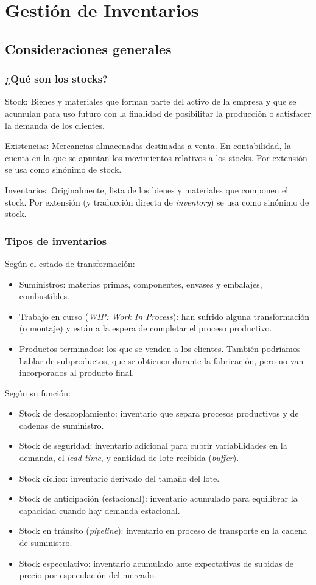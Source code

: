 \chapter{Gestión de Inventarios}
\section{Consideraciones generales}
\subsection{¿Qué son los stocks?}
Stock: Bienes y materiales que forman parte del activo de la empresa y que se acumulan para uso futuro con la finalidad de posibilitar la producción o satisfacer la demanda de los clientes.

Existencias: Mercancias almacenadas destinadas a venta. En contabilidad, la cuenta en la que se apuntan los movimientos relativos a los stocks. Por extensión se usa como sinónimo de stock.

Inventarios: Originalmente, lista de los bienes y materiales que componen el stock. Por extensión (y traducción directa de \textit{inventory}) se usa como sinónimo de stock.

\subsection{Tipos de inventarios}
Según el estado de transformación:
\begin{itemize}
    \item Suministros: materias primas, componentes, envases y embalajes, combustibles.
    \item Trabajo en curso (\textit{WIP: Work In Process}): han sufrido alguna transformación (o montaje) y están a la espera de completar el proceso productivo.
    \item Productos terminados: los que se venden a los clientes. También podríamos hablar de subproductos, que se obtienen durante la fabricación, pero no van incorporados al producto final.
\end{itemize}

Según su función:
\begin{itemize}
    \item Stock de desacoplamiento: inventario que separa procesos productivos y de cadenas de suministro.
    \item Stock de seguridad: inventario adicional para cubrir variabilidades en la demanda, el \textit{lead time}, y cantidad de lote recibida (\textit{buffer}).
    \item Stock cíclico: inventario derivado del tamaño del lote.
    \item Stock de anticipación (estacional): inventario acumulado para equilibrar la capacidad cuando hay demanda estacional.
    \item Stock en tránsito (\textit{pipeline}): inventario en proceso de transporte en la cadena de suministro.
    \item Stock especulativo: inventario acumulado ante expectativas de subidas de precio por especulación del mercado.
\end{itemize}

